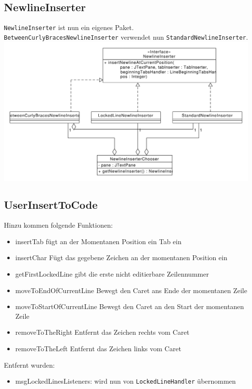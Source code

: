 \documentclass[a4paper]{scrreprt}
\begin{document}
\subsection{NewlineInserter}
\verb!NewlineInserter! ist nun ein eigenes Paket. \verb!BetweenCurlyBracesNewlineInserter! verwendet nun \verb!StandardNewlineInserter!.\\
\includegraphics[scale=0.5]{insertnewline_update.pdf}


\subsection{UserInsertToCode}
Hinzu kommen folgende Funktionen:
\begin{itemize}
\item insertTab fügt an der Momentanen Position ein Tab ein
\item insertChar Fügt das gegebene Zeichen an der momentanen Position ein
\item getFirstLockedLine gibt die erste nicht editierbare Zeilennummer
\item moveToEndOfCurrentLine Bewegt den Caret ans Ende der momentanen Zeile
\item moveToStartOfCurrentLine Bewegt den Caret an den Start der momentanen Zeile
\item removeToTheRight Entfernt das Zeichen rechts vom Caret
\item removeToTheLeft Entfernt das Zeichen links vom Caret
\end{itemize}

Entfernt wurden:
\begin{itemize}
\item msgLockedLinesListeners: wird nun von \verb!LockedLineHandler! übernommen
\end{itemize}
\end{document}
